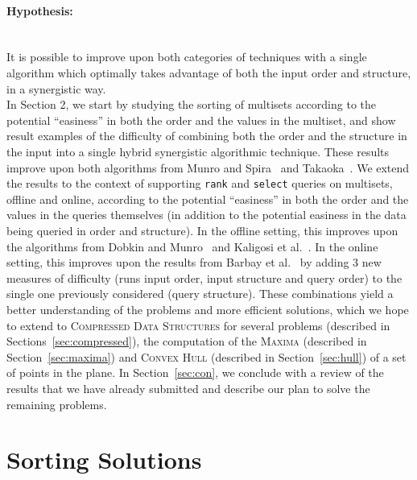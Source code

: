 
\paragraph{Hypothesis:}~\\ It is possible to improve upon both
categories of techniques with a single algorithm which optimally takes advantage
of both the input order and structure, in a synergistic way.~\\


In Section 2, we start by studying the sorting of multisets according
to the potential ``easiness'' in both the order and the values in the
multiset, and show result examples of the difficulty of combining both
the order and the structure in the input into a single hybrid
synergistic algorithmic technique.  These results improve upon both
algorithms from Munro and
Spira~\cite{1976-JComp-SortingAndSearchingInMultisets-MunroSpira} and
Takaoka~\cite{2009-Chapter-PartialSolutionAndEntropy-Takaoka}.
%
We extend the results to the context of supporting \texttt{rank} and
\texttt{select} queries on multisets, offline and online, according to
the potential ``easiness'' in both the order and the values in the
queries themselves (in addition to the potential easiness in the data
being queried in order and structure). In the offline setting, this
improves upon the algorithms from Dobkin and
Munro~\cite{1981-JACM-OptimalTimeMinimalSpaceSelectionAlgorithms-DobkinMunro}
and Kaligosi et
al.~\cite{2005-ICALP-TowardsOptimalMultopleSelection-KaligosiMehlhornMunroSanders}.
In the online setting, this improves upon the results from Barbay et
al.~\cite{2016-JDA-NearOptimalOnlineMultiselectionInInternalAndExternalMemory-BarbayGuptaRaoSorenson}
by adding 3 new measures of difficulty (runs input order, input structure
and query order) to the single one previously considered (query
structure). These combinations yield a better understanding of the
problems and more efficient solutions, which we hope to extend to
\textsc{Compressed Data Structures} for several problems (described in
Sections~\ref{sec:compressed}), the computation of the \textsc{Maxima}
(described in Section~\ref{sec:maxima}) and \textsc{Convex Hull}
(described in Section~\ref{sec:hull}) of a set of points in the
plane. In Section~\ref{sec:con}, we conclude with a review of the
results that we have already submitted and describe our plan to solve
the remaining problems.

\section{Sorting Solutions}
\label{sec:sort}

